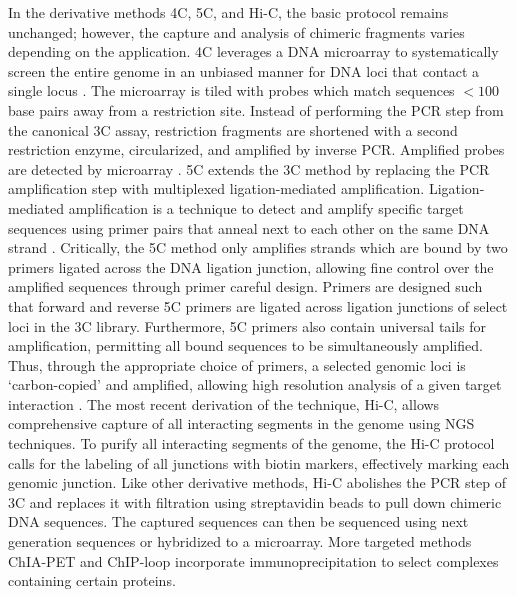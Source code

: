 In the derivative methods 4C, 5C, and Hi-C, the basic protocol remains unchanged; however, the capture and analysis of chimeric fragments varies
depending on the application.  \gls{4C} leverages a DNA microarray to systematically screen the entire genome in an unbiased manner for DNA loci
that contact a single locus \citep{simonis2006}.  The microarray is tiled with probes which match sequences $< 100$ base pairs away from a
restriction site.  Instead of performing the PCR step from the canonical \gls{3C} assay, restriction fragments are shortened with a
second restriction enzyme, circularized, and amplified by inverse PCR\@.  Amplified probes are detected by microarray \citep{simonis2006}.
\gls{5C} extends the \gls{3C} method by replacing the PCR amplification step with multiplexed ligation-mediated amplification.  Ligation-mediated
amplification is a technique to detect and amplify specific target sequences using primer pairs that anneal next to each other on the
same DNA strand \citep{dostie2006}. Critically, the 5C method only amplifies strands which are bound by two primers ligated across the DNA ligation
junction, allowing fine control over the amplified sequences through primer careful design.  Primers are designed such that forward and
reverse \gls{5C} primers are ligated across ligation junctions of select loci in the \gls{3C} library.  Furthermore, \gls{5C} primers also
contain universal tails for amplification, permitting all bound sequences to be simultaneously amplified.  Thus, through the appropriate choice of
primers, a selected genomic loci is `carbon-copied' and amplified, allowing high resolution analysis of a given target interaction \citep{dostie2006}.
The most recent derivation of the technique, Hi-C, allows comprehensive capture of all interacting segments in the genome using \gls{NGS} techniques.
To purify all interacting segments of the genome, the Hi-C protocol calls for the labeling of all junctions with biotin markers, effectively
marking each genomic junction. Like other derivative methods, Hi-C abolishes the PCR step of \gls{3C} and replaces it with filtration using
streptavidin beads to pull down chimeric DNA sequences.  The captured sequences can then be sequenced using next generation sequences or hybridized
to a microarray.  More targeted methods ChIA-PET and ChIP-loop incorporate immunoprecipitation to select complexes containing certain proteins.

